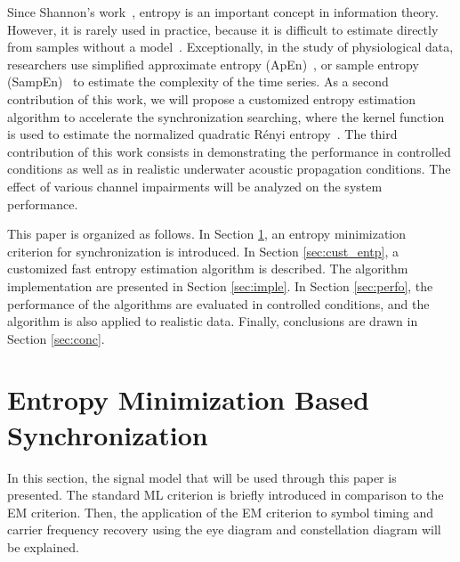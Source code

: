 \documentclass[journal,comsoc,onecolumn, 12pt,draftclsnofoot]{IEEEtran}
\begin{document}
Since Shannon's work~\cite{Shannon1948}, entropy is an important concept in information theory. 
However, it is rarely used in practice, because it is difficult to estimate directly from samples without a model~\cite{Bercher2000,Santamaria2002}.
Exceptionally, in the study of physiological data, researchers use simplified approximate entropy (ApEn)~\cite{Pincus1991}, or sample entropy (SampEn)~\cite{Richman2000} to estimate the complexity of the time series.
As a second contribution of this work, we will propose a customized entropy estimation algorithm to accelerate the synchronization searching,
where the kernel function is used to estimate the normalized quadratic R\'enyi entropy~\cite{Santamaria2002,Huang2008}.
The third contribution of this work consists in demonstrating the performance in controlled conditions as well as in realistic underwater acoustic propagation conditions.  
The effect of various channel impairments will be analyzed on the system performance.  



This paper is organized as follows.
In Section \ref{sec:entropy},
an entropy minimization criterion for synchronization is introduced. 
In Section \ref{sec:cust_entp}, a customized fast entropy estimation algorithm is described. 
The algorithm implementation are presented in Section \ref{sec:imple}.
In Section \ref{sec:perfo}, the performance of the algorithms are evaluated in controlled conditions, and the algorithm is also applied to realistic data.  
Finally, conclusions are drawn in Section \ref{sec:conc}.

\section{Entropy Minimization Based Synchronization}
\label{sec:entropy}
In this section, the signal model that will be used through this paper is presented.
The standard ML criterion is briefly introduced in comparison to the EM criterion.
Then, the application of the EM criterion to symbol timing and carrier frequency recovery using the eye diagram and constellation diagram will be explained.
\end{document}
